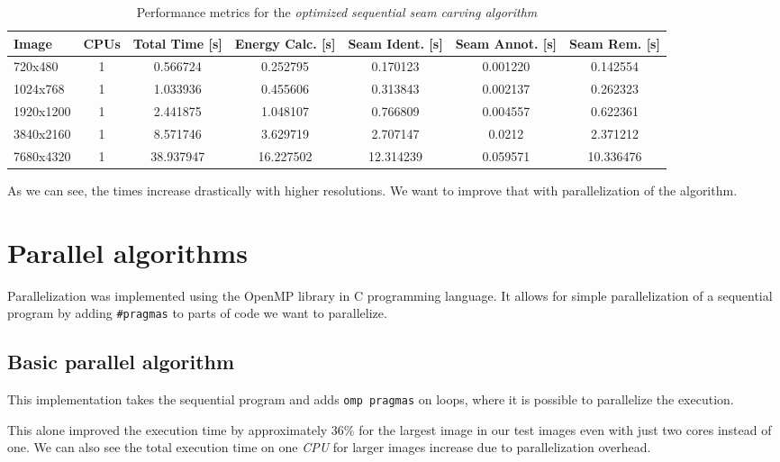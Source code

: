 \documentclass{article}
\begin{document}
\begin{table}[H]
    \centering
    \scriptsize
    \begin{tabular}{lcccccc}
        \toprule
        Image & CPUs & Total Time [s] & Energy Calc. [s] & Seam Ident. [s] & Seam Annot. [s] & Seam Rem. [s] \\
        \midrule
        720x480 & 1 & 0.566724 & 0.252795 & 0.170123 & 0.001220 & 0.142554 \\
        1024x768 & 1 & 1.033936 & 0.455606 & 0.313843 & 0.002137 & 0.262323 \\
        1920x1200 & 1 & 2.441875 & 1.048107 & 0.766809 & 0.004557 & 0.622361 \\
        3840x2160 & 1 & 8.571746 & 3.629719 & 2.707147 & 0.0212 & 2.371212\\
        7680x4320 & 1 & 38.937947 & 16.227502 & 12.314239 & 0.059571 & 10.336476 \\
        \bottomrule
    \end{tabular}
    \caption{Performance metrics for the \textit{optimized sequential seam carving algorithm}}
    \label{tab:seq_performance_optimized}
\end{table}

As we can see, the times increase drastically with higher resolutions. We want to improve that with parallelization of the algorithm.

\section{Parallel algorithms}
Parallelization was implemented using the OpenMP library in C programming language. It allows for simple parallelization of a sequential program by adding \texttt{\#pragmas} to parts of code we want to parallelize.

\subsection{Basic parallel algorithm}
This implementation takes the sequential program and adds \texttt{omp pragmas} on loops, where it is possible to parallelize the execution.

This alone improved the execution time by approximately 36\% for the largest image in our test images even with just two cores instead of one. We can also see the total execution time on one \textit{CPU} for larger images increase due to parallelization overhead.
\end{document}
